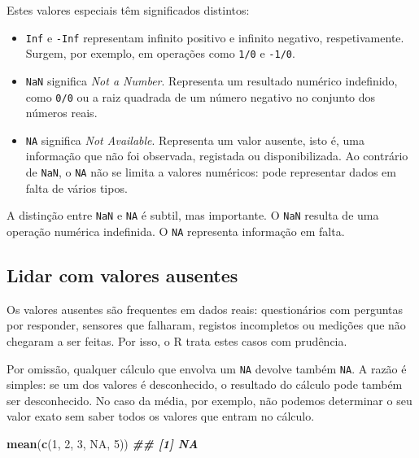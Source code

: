 \documentclass[
  portuguese,
  11pt,
  openany]{book}
\newenvironment{Shaded}{\begin{snugshade}}{\end{snugshade}}
\newcommand{\ConstantTok}[1]{\textcolor[rgb]{0.56,0.35,0.01}{#1}}
\newcommand{\DecValTok}[1]{\textcolor[rgb]{0.00,0.00,0.81}{#1}}
\newcommand{\DocumentationTok}[1]{\textcolor[rgb]{0.56,0.35,0.01}{\textbf{\textit{#1}}}}
\newcommand{\FunctionTok}[1]{\textcolor[rgb]{0.13,0.29,0.53}{\textbf{#1}}}
\newcommand{\NormalTok}[1]{#1}
\begin{document}
Estes valores especiais têm significados distintos:

\begin{itemize}
\item
  \texttt{Inf} e \texttt{-Inf} representam infinito positivo e infinito negativo, respetivamente. Surgem, por exemplo, em operações como \texttt{1/0} e \texttt{-1/0}.
\item
  \texttt{NaN} significa \emph{Not a Number}. Representa um resultado numérico indefinido, como \texttt{0/0} ou a raiz quadrada de um número negativo no conjunto dos números reais.
\item
  \texttt{NA} significa \emph{Not Available}. Representa um valor ausente, isto é, uma informação que não foi observada, registada ou disponibilizada. Ao contrário de \texttt{NaN}, o \texttt{NA} não se limita a valores numéricos: pode representar dados em falta de vários tipos.
\end{itemize}

A distinção entre \texttt{NaN} e \texttt{NA} é subtil, mas importante. O \texttt{NaN} resulta de uma operação numérica indefinida. O \texttt{NA} representa informação em falta.

\subsection{Lidar com valores ausentes}\label{lidar-com-valores-ausentes}

Os valores ausentes são frequentes em dados reais: questionários com perguntas por responder, sensores que falharam, registos incompletos ou medições que não chegaram a ser feitas. Por isso, o R trata estes casos com prudência.

Por omissão, qualquer cálculo que envolva um \texttt{NA} devolve também \texttt{NA}. A razão é simples: se um dos valores é desconhecido, o resultado do cálculo pode também ser desconhecido. No caso da média, por exemplo, não podemos determinar o seu valor exato sem saber todos os valores que entram no cálculo.

\begin{Shaded}
\begin{Highlighting}[]
\FunctionTok{mean}\NormalTok{(}\FunctionTok{c}\NormalTok{(}\DecValTok{1}\NormalTok{, }\DecValTok{2}\NormalTok{, }\DecValTok{3}\NormalTok{, }\ConstantTok{NA}\NormalTok{, }\DecValTok{5}\NormalTok{))}
\DocumentationTok{\#\# [1] NA}
\end{Highlighting}
\end{Shaded}
\end{document}
